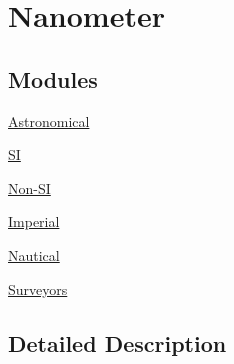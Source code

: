\hypertarget{group___e_g_x_math-_conversions-_length_conversions-_nanometer}{}\section{Nanometer}
\label{group___e_g_x_math-_conversions-_length_conversions-_nanometer}
\subsection*{Modules}
\begin{DoxyCompactItemize}
\item 
\mbox{\hyperlink{group___e_g_x_math-_conversions-_length_conversions-_nanometer-_astronomical}{Astronomical}}
\item 
\mbox{\hyperlink{group___e_g_x_math-_conversions-_length_conversions-_nanometer-_s_i}{SI}}
\item 
\mbox{\hyperlink{group___e_g_x_math-_conversions-_length_conversions-_nanometer-_non-_s_i}{Non-\/\+SI}}
\item 
\mbox{\hyperlink{group___e_g_x_math-_conversions-_length_conversions-_nanometer-_imperial}{Imperial}}
\item 
\mbox{\hyperlink{group___e_g_x_math-_conversions-_length_conversions-_nanometer-_nautical}{Nautical}}
\item 
\mbox{\hyperlink{group___e_g_x_math-_conversions-_length_conversions-_nanometer-_surveyors}{Surveyors}}
\end{DoxyCompactItemize}


\subsection{Detailed Description}
